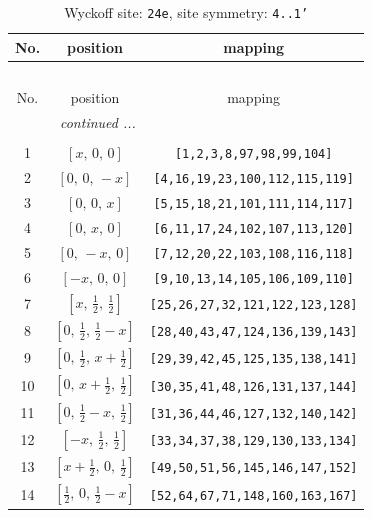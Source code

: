 \documentclass[fleqn,8pt]{jsarticle}
\begin{document}
\begin{longtable}{ccc}
\caption{Wyckoff site: {\tt 24e}, site symmetry: {\tt 4..1'}}
 \\
 \hline \hline
No. & position & mapping \\ \hline \endfirsthead

\multicolumn{2}{l}{\tablename\ \thetable{}} \\
 \hline \hline
No. & position & mapping \\ \hline \endhead

 \hline \hline
\multicolumn{2}{r}{\footnotesize\it continued ...} \\ \endfoot

 \hline \hline
\multicolumn{2}{r}{} \\ \endlastfoot

1 & $\left[ x,\, 0,\, 0 \right]$ & {\tt [1,2,3,8,97,98,99,104]} \\ \hline
2 & $\left[ 0,\, 0,\, - x \right]$ & {\tt [4,16,19,23,100,112,115,119]} \\ \hline
3 & $\left[ 0,\, 0,\, x \right]$ & {\tt [5,15,18,21,101,111,114,117]} \\ \hline
4 & $\left[ 0,\, x,\, 0 \right]$ & {\tt [6,11,17,24,102,107,113,120]} \\ \hline
5 & $\left[ 0,\, - x,\, 0 \right]$ & {\tt [7,12,20,22,103,108,116,118]} \\ \hline
6 & $\left[ - x,\, 0,\, 0 \right]$ & {\tt [9,10,13,14,105,106,109,110]} \\ \hline
7 & $\left[ x,\, \frac{1}{2},\, \frac{1}{2} \right]$ & {\tt [25,26,27,32,121,122,123,128]} \\ \hline
8 & $\left[ 0,\, \frac{1}{2},\, \frac{1}{2} - x \right]$ & {\tt [28,40,43,47,124,136,139,143]} \\ \hline
9 & $\left[ 0,\, \frac{1}{2},\, x + \frac{1}{2} \right]$ & {\tt [29,39,42,45,125,135,138,141]} \\ \hline
10 & $\left[ 0,\, x + \frac{1}{2},\, \frac{1}{2} \right]$ & {\tt [30,35,41,48,126,131,137,144]} \\ \hline
11 & $\left[ 0,\, \frac{1}{2} - x,\, \frac{1}{2} \right]$ & {\tt [31,36,44,46,127,132,140,142]} \\ \hline
12 & $\left[ - x,\, \frac{1}{2},\, \frac{1}{2} \right]$ & {\tt [33,34,37,38,129,130,133,134]} \\ \hline
13 & $\left[ x + \frac{1}{2},\, 0,\, \frac{1}{2} \right]$ & {\tt [49,50,51,56,145,146,147,152]} \\ \hline
14 & $\left[ \frac{1}{2},\, 0,\, \frac{1}{2} - x \right]$ & {\tt [52,64,67,71,148,160,163,167]} \\ \hline

\end{longtable}
\end{document}
